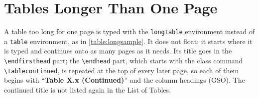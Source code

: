 \clearpage
\section{Tables Longer Than One Page}

A table too long for one page is typed with the \texttt{longtable} environment instead of a \texttt{table} environment, as in \cref{table:longsample}. It does not float: it starts where it is typed and continues onto as many pages as it needs. Its title goes in the \verb+\endfirsthead+ part; the \verb+\endhead+ part, which starts with the class command \verb+\tablecontinued+, is repeated at the top of every later page, so each of them begins with ``\textbf{Table X.x (Continued)}'' and the column headings (GSO). The continued title is not listed again in the List of Tables.

